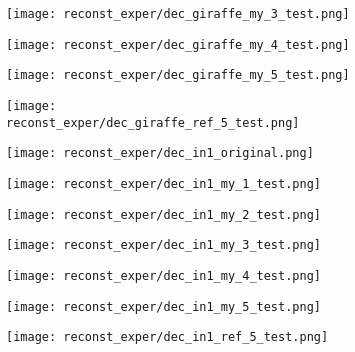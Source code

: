 \begin{figure}[H]
\begin{subfigure}[b]{0.13\linewidth}
		\texttt{[image: reconst\_exper/dec\_giraffe\_my\_3\_test.png]} %
	\end{subfigure}
	\begin{subfigure}[b]{0.13\linewidth}
		\texttt{[image: reconst\_exper/dec\_giraffe\_my\_4\_test.png]} %
	\end{subfigure}
	\begin{subfigure}[b]{0.13\linewidth}
		\texttt{[image: reconst\_exper/dec\_giraffe\_my\_5\_test.png]} %
	\end{subfigure}
	\begin{subfigure}[b]{0.13\linewidth}
		\texttt{[image: reconst\_exper/dec\_giraffe\_ref\_5\_test.png]} %
	\end{subfigure}
	\centering
	\begin{subfigure}[b]{0.13\linewidth}
		\texttt{[image: reconst\_exper/dec\_in1\_original.png]} %
	\end{subfigure}
	\begin{subfigure}[b]{0.13\linewidth}
		\texttt{[image: reconst\_exper/dec\_in1\_my\_1\_test.png]} %
	\end{subfigure}
	\begin{subfigure}[b]{0.13\linewidth}
		\texttt{[image: reconst\_exper/dec\_in1\_my\_2\_test.png]} %
	\end{subfigure}
	\begin{subfigure}[b]{0.13\linewidth}
		\texttt{[image: reconst\_exper/dec\_in1\_my\_3\_test.png]} %
	\end{subfigure}
	\begin{subfigure}[b]{0.13\linewidth}
		\texttt{[image: reconst\_exper/dec\_in1\_my\_4\_test.png]} %
	\end{subfigure}
	\begin{subfigure}[b]{0.13\linewidth}
		\texttt{[image: reconst\_exper/dec\_in1\_my\_5\_test.png]} %
	\end{subfigure}
	\begin{subfigure}[b]{0.13\linewidth}
		\texttt{[image: reconst\_exper/dec\_in1\_ref\_5\_test.png]} %
	\end{subfigure}

\end{figure}
